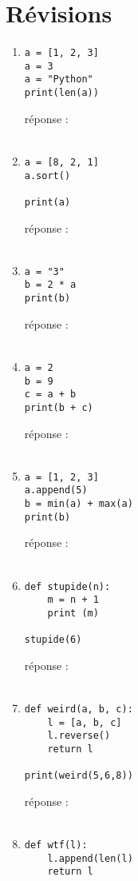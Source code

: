 \documentclass[12pt,a4paper]{article}
\newcommand{\codeintext}[1]{\texttt{#1}}
\newcommand{\response}{réponse : \hrulefill\\\\}
\begin{document}
\section*{Révisions}


\begin{enumerate}

\item
\begin{lstlisting}
a = [1, 2, 3]
a = 3
a = "Python"
print(len(a))

\end{lstlisting}
\response %

\item
\begin{lstlisting}
a = [8, 2, 1]
a.sort()

print(a)
\end{lstlisting}
\response %

\item
\begin{lstlisting}
a = "3"
b = 2 * a
print(b)
\end{lstlisting} 
\response %

\item
\begin{lstlisting}
a = 2
b = 9
c = a + b
print(b + c)
\end{lstlisting}
\response %

\item
\begin{lstlisting}
a = [1, 2, 3]
a.append(5)
b = min(a) + max(a)
print(b)
\end{lstlisting}
\response %
\pagebreak

\item
\begin{lstlisting}
def stupide(n):
	m = n + 1
	print (m)

stupide(6)

\end{lstlisting}
\response %

\item
\begin{lstlisting}
def weird(a, b, c):
	l = [a, b, c]
	l.reverse()
	return l

print(weird(5,6,8))
\end{lstlisting}
\response %

\item
\begin{lstlisting}
def wtf(l):
	l.append(len(l)
	return l
	

\end{lstlisting}
\end{enumerate}
\end{document}
